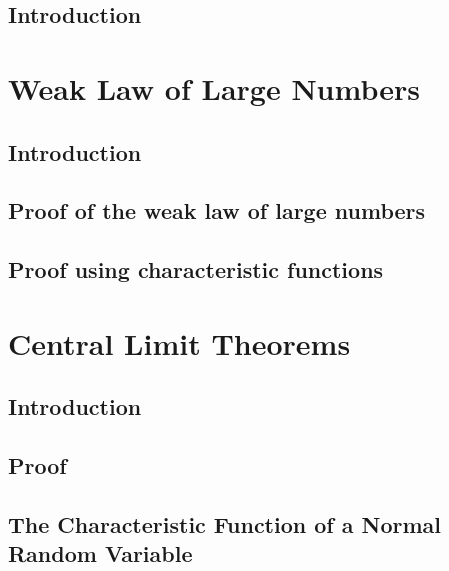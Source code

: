 \documentclass[10pt,a4paper]{book}
\begin{document}
	\section{Introduction}

	\chapter{Weak Law of Large Numbers}
	\section{Introduction}
	\section{Proof of the weak law of large numbers}
	\section{Proof using characteristic functions}
	
	\chapter{Central Limit Theorems}
	\section{Introduction}
	\section{Proof}
	\section{The Characteristic Function of a Normal Random Variable}
\end{document}
